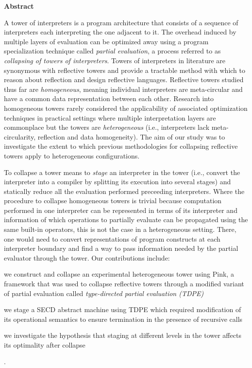 \newpage
{\Huge \bf Abstract}
\vspace{24pt} 

A tower of interpreters is a program architecture that consists of a sequence of interpreters each interpreting the one adjacent to it. The overhead induced by multiple layers of evaluation can be optimized away using a program specialization technique called \textit{partial evaluation}, a process referred to as \textit{collapsing of towers of interpreters}. %
Towers of interpreters in literature are synonymous with reflective towers and provide a tractable method with which to reason about reflection and design reflective languages. Reflective towers studied thus far are \textit{homogeneous}, meaning individual interpreters are meta-circular and have a common data representation between each other.
Research into homogeneous towers rarely considered the applicability of associated optimization techniques in practical settings where multiple interpretation layers are commonplace but the towers are \textit{heterogeneous} (i.e., interpreters lack meta-circularity, reflection and data homogeneity).
The aim of our study was to investigate the extent to which previous methodologies for collapsing reflective towers apply to heterogeneous configurations.

To collapse a tower means to \textit{stage} an interpreter in the tower (i.e., convert the interpreter into a compiler by splitting its execution into several stages) and statically reduce all the evaluation performed preceeding interpreters. Where the procedure to collapse homogeneous towers is trivial because computation performed in one interpreter can be represented in terms of its interpreter and information of which operations to partially evaluate can be propagated using the same built-in operators, this is not the case in a heterogeneous setting. There, one would need to convert representations of program constructs at each interpreter boundary and find a way to pass information needed by the partial evaluator through the tower. Our contributions include:
\begin{enumerate*}[label=(\arabic*)]
    \item we construct and collapse an experimental heterogeneous tower using Pink, a framework that was used to collapse reflective towers through a modified variant of partial evaluation called \textit{type-directed partial evaluation (TDPE)}
    \item we stage a SECD abstract machine using TDPE which required modification of its operational semantics to ensure termination in the presence of recursive calls
    \item we investigate the hypothesis that staging at different levels in the tower affects its optimality after collapse
\end{enumerate*}.

